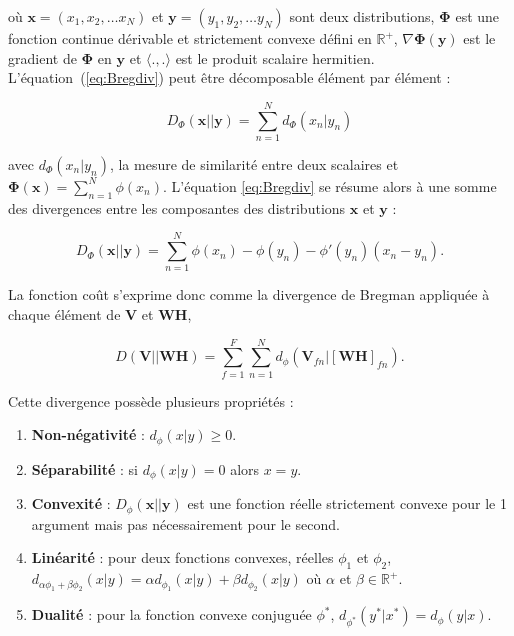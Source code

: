 où  $\mathbf{x} = (x_1, x_2, \dots x_N)$ et $\mathbf{y} = (y_1, y_2, \dots y_N)$ sont deux distributions, $\mathbf{\Phi}$ est une fonction continue dérivable et strictement convexe défini en $\mathbb{R}^+$, $\nabla\mathbf{\Phi}(\mathbf{y})$ est le gradient de $\mathbf{\Phi}$ en $\mathbf{y}$ et $\langle .,.\rangle$ est le produit scalaire hermitien. L'équation~(\ref{eq:Bregdiv}) peut être décomposable élément par élément :

\begin{equation}
D_{\Phi}(\mathbf{x}\vert\vert \mathbf{y}) = \sum_{n=1}^N d_{\Phi}(x_n\vert y_n)
\end{equation}

avec $d_{\Phi}(x_n\vert y_n)$, la mesure de similarité entre deux scalaires et $\mathbf{\Phi(x)} = \sum_{n=1}^N \phi(x_n)$. L'équation \ref{eq:Bregdiv} se résume alors à une somme des divergences entre les composantes des distributions $\mathbf{x}$ et $\mathbf{y}$ :

\begin{equation}\label{eq:divBregWise}
D_{\Phi}(\textbf{x}\vert\vert \textbf{y}) = \sum_{n=1}^N \phi(x_n)-\phi(y_n)-\phi'(y_n)(x_n-y_n).
\end{equation}

La fonction coût s'exprime donc comme la divergence de Bregman appliquée à chaque élément de $\mathbf{V}$ et $\mathbf{WH}$,

\begin{equation}\label{eq:similarite2}
D\left(\textbf{V} \vert\vert \textbf{WH} \right) = \sum_{f = 1}^{F} \sum_{n = 1}^{N} d_{\phi}
\left(\textbf{V}_{fn} \vert \left[ \textbf{WH} \right]_{fn} \right).
\end{equation}


Cette divergence possède plusieurs propriétés :

\begin{enumerate}
\item \textbf{Non-négativité} : $d_{\phi}(x\vert y) \geq 0$.

\item \textbf{Séparabilité} : si $d_{\phi}(x\vert y) = 0$ alors $x = y$.

\item \textbf{Convexité} : $D_{\phi}(\textbf{x}\vert\vert \textbf{y})$ est une fonction réelle strictement convexe pour le 1\ier{} argument mais pas nécessairement pour le second.

\item \textbf{Linéarité} : pour deux fonctions convexes, réelles $\phi_1$ et $\phi_2$,  $d_{\alpha \phi_1 + \beta \phi_2}(x\vert y) = \alpha d_{\phi_1}(x\vert y)+\beta d_{\phi_2}(x\vert y)$ où $\alpha$ et $\beta \in \mathbb{R}^+$.

\item \textbf{Dualité} : pour la fonction convexe conjuguée $\phi^{\ast}$, $d_{\phi^{\ast}}(y^{\ast}\vert x^{\ast}) = d_{\phi}(y \vert x)$.
\end{enumerate}

